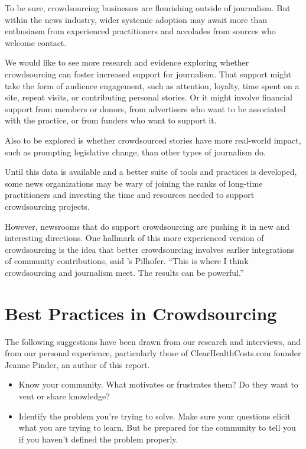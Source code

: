 \begin{itemize}
\begin{itemize}
To be sure, crowdsourcing businesses are flourishing outside of journalism. But within the news industry, wider systemic adoption may await more than enthusiasm from experienced practitioners and accolades from sources who welcome contact.  

We would like to see more research and evidence exploring whether crowdsourcing can foster increased support for journalism. That support might take the form of audience engagement, such as attention, loyalty, time spent on a site, repeat visits, or contributing personal stories. Or it might involve financial support from members or donors, from advertisers who want to be associated with the practice, or from funders who want to support it. 

Also to be explored is whether crowdsourced stories have more real-world impact, such as prompting legislative change, than other types of journalism do. 

Until this data is available and a better suite of tools and practices is developed, some news organizations may be wary of joining the ranks of long-time practitioners and investing the time and resources needed to support crowdsourcing projects.

However, newsrooms that do support crowdsourcing are pushing it in new and interesting directions. One hallmark of this more experienced version of crowdsourcing is the idea that better crowdsourcing involves earlier integrations of community contributions, said ’s Pilhofer. ``This is where I think crowdsourcing and journalism meet. The results can be powerful.''


\section{Best Practices in Crowdsourcing} 

The following suggestions have been drawn from our research and interviews, and from our personal experience, particularly those of ClearHealthCosts.com founder Jeanne Pinder, an author of this report. 
\begin{itemize}
\item Know your community. What motivates or frustrates them? Do they want to vent or share knowledge?

\item Identify the problem you’re trying to solve. Make sure your questions elicit what you are trying to learn. But be prepared for the community to tell you if you haven’t defined the problem properly.


\end{itemize}
\end{itemize}
\end{itemize}
